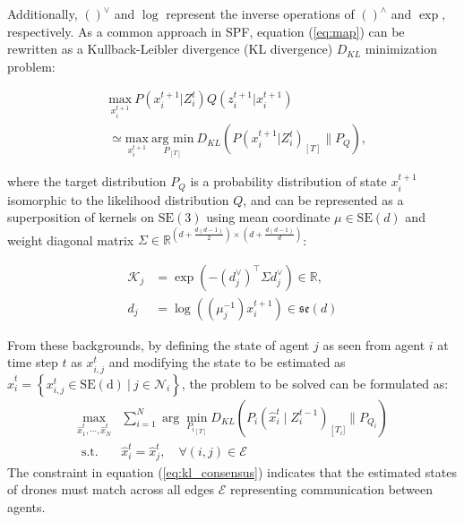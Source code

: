 \documentclass[a4paper,fleqn,10pt,twocolumn]{SICE_ISCS}
\begin{document}
Additionally, $()^\vee$ and $\log$ represent the inverse operations of $()^\wedge$ and $\exp$, respectively.
As a common approach in SPF, equation (\ref{eq:map}) can be rewritten as a Kullback-Leibler divergence (KL divergence) $D_{KL}$ minimization problem:

\begin{equation}
\begin{aligned}
  &\underset{x_i^{t+1}}{\text{max}} \:  P(x_i^{t+1}|Z_i^{t}) Q(z_i^{t+1}|x_i^{t+1})\\
  &\simeq \underset{x_i^{t+1}}{\text{max}} \: \underset{P_{[T]}}{\text{arg min}} \: D_{KL}(P(x_i^{t+1}|Z_i^{t})_{[T]} \| P_Q),
\end{aligned}
\end{equation}

where the target distribution $P_Q$ is a probability distribution of state $x_i^{t+1}$ isomorphic to the likelihood distribution $Q$, and can be represented as a superposition of kernels on $\mathrm{SE(3)}$ using mean coordinate $\mu\in\mathrm{SE}(d)$ and weight diagonal matrix $\Sigma \in {{\mathbb{R}}}^{(d+\frac{d(d-1)}{2})\times (d+\frac{d(d-1)}{d})}$:

\begin{equation}
\begin{aligned}
{\mathcal{K}}_j&=\exp \left(-(d_j^\vee)^{\top} \Sigma d_j^\vee \right)\in {{\mathbb{R}}},\\
d_j&=\log \left((\mu_j^{-1}) x_i^{t+1} \right)\in {\mathfrak{se}}(d)
\end{aligned}
\end{equation}

From these backgrounds, by defining the state of agent $j$ as seen from agent $i$ at time step $t$ as $x_{i,j}^t$ and modifying the state to be estimated as $\hat x_i^t= \left\{ x_{i,j}^t \in \mathrm{SE(d)}\: | \: j \in \mathcal{N}_i \right\}$, the problem to be solved can be formulated as:
\begin{equation}
\begin{aligned}\label{eq:kl_consensus}
\max _{\hat x_{1}^{t}, \cdots, \hat x_{N}^{t}} & \sum_{i=1}^{N} \arg \min _{{P_{i}}_{[T]}} D_{K L}\left(P_{i}\left(\hat x_{i}^{t} \mid Z_{i}^{t-1}\right)_{\left[T_{i}]\right.} \| P_{Q_{i}} \right) \\
\text { s.t. } & \hat x_{i}^{t}=\hat x_{j}^{t}, \quad\forall(i, j) \in \mathcal{E}
\end{aligned}
\end{equation}
The constraint in equation (\ref{eq:kl_consensus}) indicates that the estimated states of drones must match across all edges $\mathcal{E}$ representing communication between agents.
\end{document}
